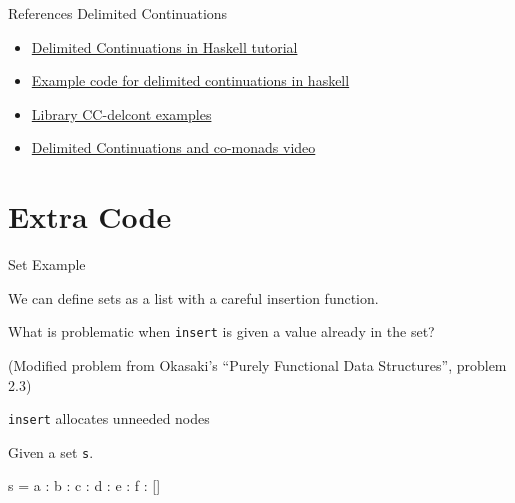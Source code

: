 \documentclass[ignorenonframetext,]{beamer}
\begin{document}
\begin{frame}[allowframebreaks]{References}
Delimited Continuations

\begin{itemize}
\itemsep1pt\parskip0pt
\item
  \href{http://okmij.org/ftp/continuations/Haskell-tutorial.pdf}{Delimited
  Continuations in Haskell tutorial}
\item
  \href{http://okmij.org/ftp/continuations/ContExample.hs}{Example code
  for delimited continuations in haskell}
\item
  \href{https://wiki.haskell.org/Library/CC-delcont}{Library CC-delcont
  examples}
\item
  \href{https://www.youtube.com/watch?v=uN3hyzywzZk}{Delimited
  Continuations and co-monads video}
\end{itemize}

\end{frame}

\section{Extra Code}\label{extra-code}

\begin{frame}[fragile]{Set Example}

We can define sets as a list with a careful insertion function.


What is problematic when \texttt{insert} is given a value already in the
set?

(Modified problem from Okasaki's ``Purely Functional Data Structures'',
problem 2.3)

\end{frame}

\begin{frame}[fragile]{\texttt{insert} allocates unneeded nodes}

Given a set \texttt{s}.

\begin{haskellcode}
s = a : b : c : d : e : f : []
\end{haskellcode}

\end{frame}
\end{document}

